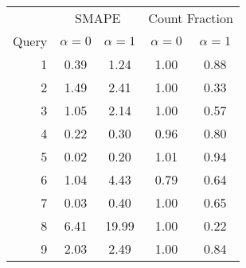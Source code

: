 \begin{tabular}{rcccc}
\toprule
      & \multicolumn{2}{c}{SMAPE}   & \multicolumn{2}{c}{Count Fraction} \\
Query & $\alpha = 0$ & $\alpha = 1$ & $\alpha = 0$ & $\alpha = 1$    \\
\midrule
    1 & 0.39         & 1.24         & 1.00         & 0.88            \\
    2 & 1.49         & 2.41         & 1.00         & 0.33            \\
    3 & 1.05         & 2.14         & 1.00         & 0.57            \\
    4 & 0.22         & 0.30         & 0.96         & 0.80            \\
    5 & 0.02         & 0.20         & 1.01         & 0.94            \\
    6 & 1.04         & 4.43         & 0.79         & 0.64            \\
    7 & 0.03         & 0.40         & 1.00         & 0.65            \\
    8 & 6.41         & 19.99        & 1.00         & 0.22            \\
    9 & 2.03         & 2.49         & 1.00         & 0.84            \\
\bottomrule
\end{tabular}
